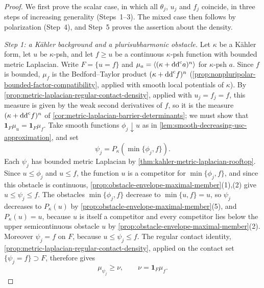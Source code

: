 \begin{proof}
We first prove the scalar case, in which all $\theta_j$, $u_j$ and $f_j$ coincide, in three steps of increasing generality (Steps~1--3). The mixed case then follows by polarization (Step~4), and Step~5 proves the assertion about the density.

\emph{Step 1: a K\"ahler background and a plurisubharmonic obstacle.} Let $\kappa$ be a K\"ahler form, let $u$ be $\kappa$-psh, and let $f\geq u$ be a continuous $\kappa$-psh function with bounded metric Laplacian. Write $F=\{u=f\}$ and $\mu_a=\langle(\kappa+\mathrm{dd}^{\mathrm{c}} a)^n\rangle$ for $\kappa$-psh $a$. Since $f$ is bounded, $\mu_f$ is the Bedford--Taylor product $(\kappa+\mathrm{dd}^{\mathrm{c}} f)^n$ (\cref{prop:nonpluripolar-bounded-factor-compatibility}, applied with smooth local potentials of $\kappa$). By \cref{prop:metric-laplacian-regular-contact-density}, applied with $u_j=f_j=f$, this measure is given by the weak second derivatives of $f$, so it is the measure $(\kappa+\mathrm{dd}^{\mathrm{c}} f)^n$ of \cref{cor:metric-laplacian-barrier-determinants}; we must show that $\mathbf1_F\mu_u=\mathbf1_F\mu_f$. Take smooth functions $\phi_j\downarrow u$ as in \cref{lem:smooth-decreasing-usc-approximation}, and set
\[
 \psi_j=P_\kappa(\min\{\phi_j,f\}).
\]
Each $\psi_j$ has bounded metric Laplacian by \cref{thm:kahler-metric-laplacian-rooftop}. Since $u\leq\phi_j$ and $u\leq f$, the function $u$ is a competitor for $\min\{\phi_j,f\}$, and since this obstacle is continuous, \cref{prop:obstacle-envelope-maximal-member}(1),(2) give $u\leq\psi_j\leq f$. The obstacles $\min\{\phi_j,f\}$ decrease to $\min\{u,f\}=u$, so $\psi_j$ decreases to $P_\kappa(u)$ by \cref{prop:obstacle-envelope-maximal-member}(5), and $P_\kappa(u)=u$, because $u$ is itself a competitor and every competitor lies below the upper semicontinuous obstacle $u$ by \cref{prop:obstacle-envelope-maximal-member}(2). Moreover $\psi_j=f$ on $F$, because $u\leq\psi_j\leq f$. The regular contact identity, \cref{prop:metric-laplacian-regular-contact-density}, applied on the contact set $\{\psi_j=f\}\supset F$, therefore gives
\[
 \mu_{\psi_j}\geq\nu,
 \qquad \nu=\mathbf1_F\mu_f.
\]


\end{proof}

